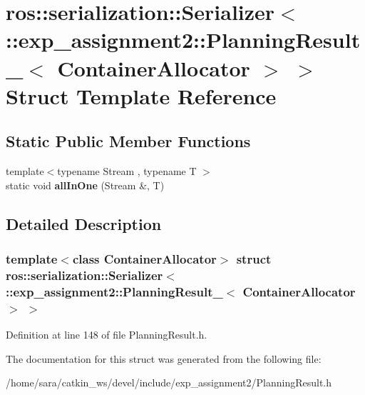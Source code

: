 \hypertarget{structros_1_1serialization_1_1Serializer_3_01_1_1exp__assignment2_1_1PlanningResult___3_01ContainerAllocator_01_4_01_4}{}\section{ros\+:\+:serialization\+:\+:Serializer$<$ \+:\+:exp\+\_\+assignment2\+:\+:Planning\+Result\+\_\+$<$ Container\+Allocator $>$ $>$ Struct Template Reference}
\label{structros_1_1serialization_1_1Serializer_3_01_1_1exp__assignment2_1_1PlanningResult___3_01ContainerAllocator_01_4_01_4}
\subsection*{Static Public Member Functions}
\begin{DoxyCompactItemize}
\item 
\mbox{\label{structros_1_1serialization_1_1Serializer_3_01_1_1exp__assignment2_1_1PlanningResult___3_01ContainerAllocator_01_4_01_4_a8072607938a4bbaded7fb08762b8ac43}} 
{\footnotesize template$<$typename Stream , typename T $>$ }\\static void {\bfseries all\+In\+One} (Stream \&, T)
\end{DoxyCompactItemize}


\subsection{Detailed Description}
\subsubsection*{template$<$class Container\+Allocator$>$\newline
struct ros\+::serialization\+::\+Serializer$<$ \+::exp\+\_\+assignment2\+::\+Planning\+Result\+\_\+$<$ Container\+Allocator $>$ $>$}



Definition at line 148 of file Planning\+Result.\+h.



The documentation for this struct was generated from the following file\+:\begin{DoxyCompactItemize}
\item 
/home/sara/catkin\+\_\+ws/devel/include/exp\+\_\+assignment2/Planning\+Result.\+h\end{DoxyCompactItemize}
